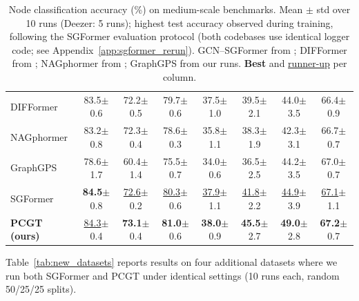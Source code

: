 \documentclass[sigconf]{acmart}
\newcommand{\best}[1]{\textcolor{bestcolor}{\textbf{#1}}}
\newcommand{\runup}[1]{\textcolor{runnerup}{\underline{#1}}}
\begin{document}
\begin{table}[t]
\begin{tabular}{l|ccc|cccc}
DIFFormer & 83.5{\scriptsize$\pm$0.6} & 72.2{\scriptsize$\pm$0.5} & 79.7{\scriptsize$\pm$0.6} & 37.5{\scriptsize$\pm$1.0} & 39.5{\scriptsize$\pm$2.1} & 44.0{\scriptsize$\pm$3.5} & 66.4{\scriptsize$\pm$0.9} \\
NAGphormer & 83.2{\scriptsize$\pm$0.8} & 72.3{\scriptsize$\pm$0.4} & 78.6{\scriptsize$\pm$0.3} & 35.8{\scriptsize$\pm$1.1} & 38.3{\scriptsize$\pm$1.9} & 42.3{\scriptsize$\pm$3.1} & 66.7{\scriptsize$\pm$0.7} \\
GraphGPS & 78.6{\scriptsize$\pm$1.7} & 60.4{\scriptsize$\pm$1.4} & 75.5{\scriptsize$\pm$0.7} & 34.0{\scriptsize$\pm$0.6} & 36.5{\scriptsize$\pm$2.5} & 44.2{\scriptsize$\pm$3.5} & 67.0{\scriptsize$\pm$0.7} \\
SGFormer & \best{84.5}{\scriptsize$\pm$0.8} & \runup{72.6}{\scriptsize$\pm$0.2} & \runup{80.3}{\scriptsize$\pm$0.6} & \runup{37.9}{\scriptsize$\pm$1.1} & \runup{41.8}{\scriptsize$\pm$2.2} & \runup{44.9}{\scriptsize$\pm$3.9} & \runup{67.1}{\scriptsize$\pm$1.1} \\
\midrule
\textbf{PCGT (ours)} & \runup{84.3}{\scriptsize$\pm$0.4} & \best{73.1}{\scriptsize$\pm$0.4} & \best{81.0}{\scriptsize$\pm$0.6} & \best{38.0}{\scriptsize$\pm$0.9} & \best{45.5}{\scriptsize$\pm$2.7} & \best{49.0}{\scriptsize$\pm$2.8} & \best{67.2}{\scriptsize$\pm$0.7} \\
\bottomrule
\end{tabular}
\caption{Node classification accuracy (\%) on medium-scale benchmarks. Mean $\pm$ std over 10 runs (Deezer: 5 runs); highest test accuracy observed during training, following the SGFormer evaluation protocol (both codebases use identical logger code; see Appendix~\ref{app:sgformer_rerun}). GCN--SGFormer from \citet{wu2023sgformer}; DIFFormer from \citet{wu2023difformer}; NAGphormer from \citet{chen2023nagphormer}; GraphGPS from our runs. \best{Best} and \runup{runner-up} per column.}
\label{tab:main}
\end{table}

Table~\ref{tab:new_datasets} reports results on four additional datasets where we run both SGFormer and PCGT under identical settings (10 runs each, random 50/25/25 splits).
\end{document}
